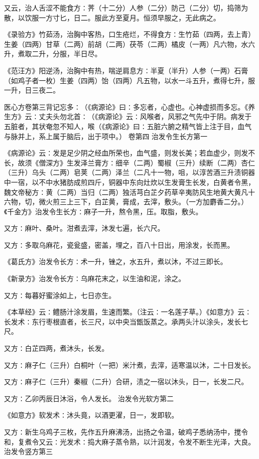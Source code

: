 \documentclass[a4paper,12pt,UTF8,twoside]{ctexbook}
\begin{document}
又云，治人舌涩不能食方∶荠（十二分）人参（二分）防己（二分）切，捣筛为散，以饮服一方寸匕，日二。服此方至夏月。恒须早服之，无此病之。

《录验方》竹茹汤，治胸中客热，口生疮烂，不得食方∶生竹茹（四两，去上青）生姜（四两）甘草（二两）前胡（二两）茯苓（二两）橘皮（一两）凡六物，水六升，煮取二升，分服，半日尽。

《范汪方》阳逆汤，治胸中有热，喘逆肩息方∶半夏（半升）人参（一两）石膏（如鸡子者一枚）生姜（四两）饴（四两）凡五物，以水一斗五升，煮得七升，服一升，日三夜二。

医心方卷第三背记忘多∶（《病源论》曰∶多忘者，心虚也。心神虚损而多忘。《养生方》云∶丈夫头勿北首∶（《病源论》云∶风喉者，风邪之气先中于阴。病发于五脏者，其状奄忽不知人，喉（《病源论》曰∶五脏六腑之精气皆上注于目，血气与脉并上，系上属于脑后，出于项中。）
卷第四
治发令生长方第一

《病源论》云∶发是足少阴之经血所荣也，血气盛，则发长美；若血虚少，则发不长，故须《僧深方》生发泽兰膏方∶细辛（二两）蜀椒（三升）续断（二两）杏仁（三升）乌头（二两）皂荚（二两）泽兰（二凡十一物，咀，以淳苦酒三升渍铜器中一宿，以不中水猪肪成煎四斤，铜器中东向灶炊以生发膏生长发，白黄者令黑，魏文帝秘方∶黄（二两）当归（二两）独活芎白芷夕药草辛夷防风生地黄大黄凡十六物，切，微火煎三上三下，白芷黄，膏成，去滓，敷头。（一方加麝香二分。）《千金方》治发令生长方∶麻子一升，熬令黑，压。取脂，敷头。

又方∶麻叶、桑叶。泔煮去滓，沐发七遍，长六尺。

又方∶多取乌麻花，瓷瓮盛，密盖，埋之，百八十日出，用涂发，长而黑。

《葛氏方》治发令长方∶术一升，锉之，水五升，煮以沐，不过三即长。

《新录方》治发令长方∶乌麻花末之，以生油和泥，涂之。

又方∶每暮好蜜涂如上，七日亦生。

《本草经》云∶鳢肠汁涂发眉，生速而繁。（注云∶一名莲子草。）《如意方》云∶长发术∶东行枣根直者，长三尺，以中央当甑饭蒸之。承两头汁以涂头，发长七尺。

又方∶白芷四两，煮沐头，长发。

又方∶麻子仁（三升）白桐叶（一把）米汁煮，去滓，适寒温以沐，二十日发长。

又方∶麻子仁（三升）秦椒（二升）合研，渍之一宿以沐头，日一，长发二尺。

又方∶乙卯丙辰日沐浴，令人发长。
治发令光软方第二

《如意方》软发术∶沐头竟，以酒更濯，日一，发即软。

又方∶新生乌鸡子三枚，先作五升麻沸汤，出扬之令温，破鸡子悉纳汤中，搅令和，复煮令又云∶光发术∶捣大麻子蒸令熟，以汁润发，令发不断生光泽，大良。
治发令竖方第三
\end{document}
